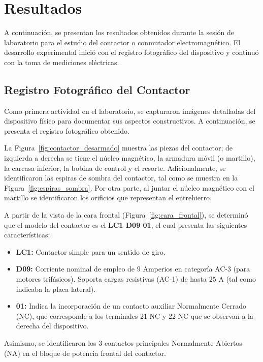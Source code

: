 \section{Resultados}

A continuación, se presentan los resultados obtenidos durante la sesión de laboratorio para el estudio del contactor o conmutador electromagnético. El desarrollo experimental inició con el registro fotográfico del dispositivo y continuó con la toma de mediciones eléctricas.

\subsection{Registro Fotográfico del Contactor}
Como primera actividad en el laboratorio, se capturaron imágenes detalladas del dispositivo físico para documentar sus aspectos constructivos. A continuación, se presenta el registro fotográfico obtenido.

La Figura~\ref{fig:contactor_desarmado} muestra las piezas del contactor; de izquierda a derecha se tiene el núcleo magnético, la armadura móvil (o martillo), la carcasa inferior, la bobina de control y el resorte. Adicionalmente, se identificaron las espiras de sombra del contactor, tal como se muestra en la Figura~\ref{fig:espiras_sombra}. Por otra parte, al juntar el núcleo magnético con el martillo se identificaron los orificios que representan el entrehierro.

A partir de la vista de la cara frontal (Figura~\ref{fig:cara_frontal}), se determinó que el modelo del contactor es el \textbf{LC1 D09 01}, el cual presenta las siguientes características:
\begin{itemize}
    \item \textbf{LC1:} Contactor simple para un sentido de giro.
    \item \textbf{D09:} Corriente nominal de empleo de $9$ Amperios en categoría AC-3 (para motores trifásicos). Soporta cargas resistivas (AC-1) de hasta $25$ A (tal como indicaba la placa lateral).
    \item \textbf{01:} Indica la incorporación de un contacto auxiliar Normalmente Cerrado (NC), que corresponde a los terminales 21 NC y 22 NC que se observan a la derecha del dispositivo.
\end{itemize}
Asimismo, se identificaron los $3$ contactos principales Normalmente Abiertos (NA) en el bloque de potencia frontal del contactor.


